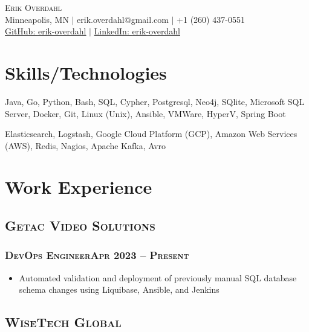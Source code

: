 \documentclass{article}
\newcommand{\resumeSection}[1]{\section*{#1}}
\newcommand{\institution}[1]{\subsection*{\scshape{#1}}}
\newcommand{\jobPosition}[3]{\subsubsection*{\scshape{#1}\hfill #2 -- #3}}
\begin{document}
\begin{center}
  {\Huge\scshape{Erik Overdahl}}
  \\\vspace{5pt}
  \normalsize{
    Minneapolis, MN
    $|$
    erik.overdahl@gmail.com
    $|$
    +1 (260) 437-0551
    \\
    \href{https://github.com/erik-overdahl}{GitHub: \underline{erik-overdahl}}
    $|$
    \href{https://linkedin.com/in/erik-overdahl}{LinkedIn: \underline{erik-overdahl}}
  }
\end{center}

\resumeSection{Skills/Technologies}
  \begin{description}[noitemsep]
      \item [Proficient]
          Java,
          Go,
          Python,
          Bash,
          SQL,
          Cypher,
          Postgresql,
          Neo4j,
          SQlite,
          Microsoft SQL Server,
          Docker,
          Git,
          Linux (Unix),
          Ansible,
          VMWare,
          HyperV,
          Spring Boot

      \item [Exposure]
          Elasticsearch,
          Logstash,
          Google Cloud Platform (GCP),
          Amazon Web Services (AWS),
          Redis,
          Nagios,
          Apache Kafka,
          Avro
  \end{description}

\resumeSection{Work Experience}

  \institution{Getac Video Solutions}

    \jobPosition{DevOps Engineer}{Apr 2023}{Present}
    \begin{itemize}[noitemsep]
      \item
            Automated validation and deployment of previously manual SQL
            database schema changes using Liquibase, Ansible, and Jenkins
    \end{itemize}

  \institution{WiseTech Global}
\end{document}
